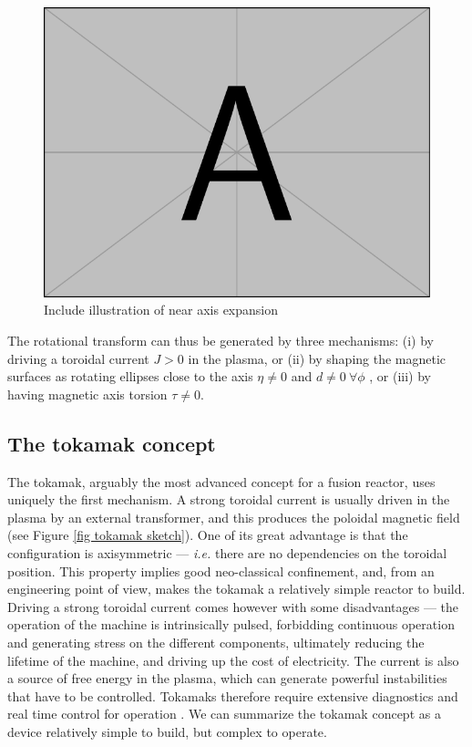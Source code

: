 \documentclass[my_thesis.tex]{subfiles}
\begin{document}
\begin{figure}
    \centering
    \includegraphics[width=\linewidth]{images/example-image-a.pdf}
    \caption{\color{red} Include illustration of near axis expansion}
    \label{fig.near axis expansion}
\end{figure}


The rotational transform can thus be generated by three mechanisms: (i) by driving a toroidal current $J>0$ in the plasma, or (ii) by shaping the magnetic surfaces as rotating ellipses close to the axis $\eta\neq 0$ and $d\neq 0\ \forall\phi$ , or (iii) by having magnetic axis torsion $\tau\neq 0$. 


\subsection{The tokamak concept}
The tokamak, arguably the most advanced concept for a fusion reactor, uses uniquely the first mechanism. A strong toroidal current is usually driven in the plasma by an external transformer, and this produces the poloidal magnetic field (see Figure \ref{fig tokamak sketch}). One of its great advantage is that the configuration is axisymmetric --- \textit{i.e.} there are no dependencies on the toroidal position. This property implies good neo-classical confinement, and, from an engineering point of view, makes the tokamak a relatively simple reactor to build. Driving a strong toroidal current comes however with some disadvantages --- the operation of the machine is intrinsically pulsed, forbidding continuous operation and generating stress on the different components, ultimately reducing the lifetime of the machine, and driving up the cost of electricity. The current is also a source of free energy in the plasma, which can generate powerful instabilities that have to be controlled. Tokamaks therefore require extensive diagnostics and real time control for operation \citep{federicoPaper}. We can summarize the tokamak concept as a device relatively simple to build, but complex to operate.
\end{document}
